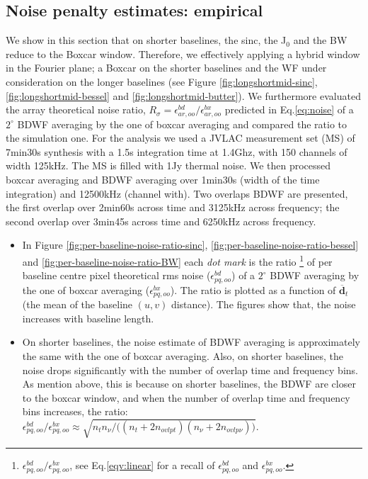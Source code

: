 \documentclass[useAMS,usenatbib]{mn2e}
\begin{document}
\subsection{Noise penalty estimates: empirical}
\label{subsec:noise}
 We show in this section that on shorter baselines, the sinc, the J$_0$ and the BW reduce to the Boxcar window. 
Therefore, we effectively applying a hybrid window in the Fourier plane; a Boxcar on the shorter baselines 
and the WF under consideration on the longer baselines (see Figure \ref{fig:longshortmid-sinc}, \ref{fig:longshortmid-bessel} and 
\ref{fig:longshortmid-butter}). We furthermore evaluated the array
theoretical noise ratio, $R_{\sigma}=\epsilon_{ar,oo}^{bd}/\epsilon_{ar,oo}^{bx}$ predicted in Eq.\ref{eq:noise} of a $2^\circ$ BDWF 
averaging  by the one of boxcar averaging and compared the ratio to the simulation one. For the 
analysis we used a JVLAC measurement set (MS) of 7min30s synthesis with a 1.5s
integration time at 1.4Ghz, with 150 channels of width 125kHz. The MS is filled with 1Jy thermal noise. We then processed boxcar 
averaging and BDWF averaging over 1min30s (width of the time integration) and 12500kHz (channel with). Two overlaps BDWF are presented, 
the first overlap over 2min60s across time and 3125kHz across frequency; the second overlap over 3min45s across time and 6250kHz across 
frequency.

\begin{itemize}
 \item In Figure \ref{fig:per-baseline-noise-ratio-sinc}, \ref{fig:per-baseline-noise-ratio-bessel} 
and \ref{fig:per-baseline-noise-ratio-BW} each \textit{dot mark} is the ratio 
\footnote{$\epsilon^{bd}_{pq,oo}/\epsilon^{bx}_{pq,oo}$, see 
Eq.\ref{eqv:linear} for a recall of $\epsilon^{bd}_{pq,oo}$ and $\epsilon^{bx}_{pq,oo}$.} of per baseline centre pixel theoretical rms 
noise ($\epsilon^{bd}_{pq,oo}$) of a $2^\circ$ BDWF 
averaging  by the one of boxcar averaging ($\epsilon^{bx}_{pq,oo}$). The ratio is plotted as a function of 
$\overline{\mathbf{d}}_t$ (the mean of the baseline $(u,v)$ distance). The figures show that, the noise increases with baseline 
length.
   \item On shorter baselines, the noise estimate of BDWF averaging is approximately the same with the one 
of boxcar averaging. Also, on shorter baselines, the noise drops significantly with the number of  overlap time and frequency bins. As 
mention above, this is because on 
shorter  baselines, the BDWF are closer to the boxcar window, and when the number of overlap time  and 
frequency  bins increases, the ratio:
 $\epsilon^{bd}_{pq,oo}/\epsilon^{bx}_{pq,oo} \approx \sqrt{n_t n_{\nu}/\big((n_t + 2n_{ovlpt})(n_{\nu} + 
2n_{ovlp\nu})\big)}$.%
\end{itemize}
\end{document}

